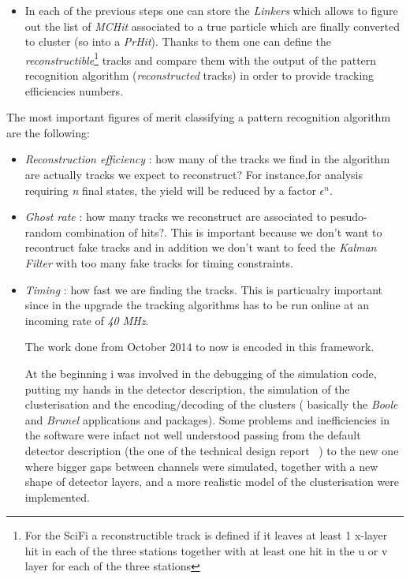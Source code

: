 \documentclass[paper=a4, fontsize=10pt]{scrartcl}
\numberwithin{equation}{section}		%
\numberwithin{figure}{section}			%
\numberwithin{table}{section}				%
\begin{document}
\begin{itemize}
\item{In each of the previous steps one can store the \textit{Linkers} which allows to figure out the list of \textit{MCHit} associated to a true particle which are finally converted to cluster (so into a \textit{PrHit}). 
Thanks to them one can define the \textit{reconstructible}\footnote{For the SciFi a reconstructible track is defined if it leaves at least 1 x-layer hit in each of the three stations together with at least one hit in the u or v layer for each of the three stations} tracks and compare them with the output of the pattern recognition algorithm (\textit{reconstructed} tracks) in order to provide tracking efficiencies numbers.}
\end{itemize}

The most important figures of merit classifying a pattern recognition algorithm are the following:\begin{itemize}
\item{\textit{Reconstruction efficiency} : how many of the tracks we find in the algorithm are actually tracks we expect to reconstruct? For instance,for analysis requiring \textit{n} final states, the yield will be reduced by a factor $\epsilon ^{n}$.}
\item{\textit{Ghost rate} : how many tracks we reconstruct are associated to pesudo-random combination of hits?. This is important because we don't want to recontruct fake tracks and in addition we don't want to feed the \textit{Kalman Filter} with too many fake tracks for timing constraints.}
\item{\textit{Timing} : how fast we are finding the tracks. This is particualry important since in the upgrade the tracking algorithms has to be run online at an incoming rate of \textit{40 MHz}.}


The work done from October 2014 to now is encoded in this framework. 

At the beginning i was involved in the debugging of the simulation code, putting my hands in the detector description, the simulation of the clusterisation and the encoding/decoding of the clusters  ( basically the \textit{Boole} and \textit{Brunel} applications and packages). 
Some problems and inefficiencies in the software were infact not well understood passing from the default detector description (the one of the technical design report ~\cite{SciFiTDR}) to the new one where bigger gaps between channels were simulated, together with a new shape of detector layers, and a more realistic model of the clusterisation were implemented. 


\end{itemize}
\end{document}
